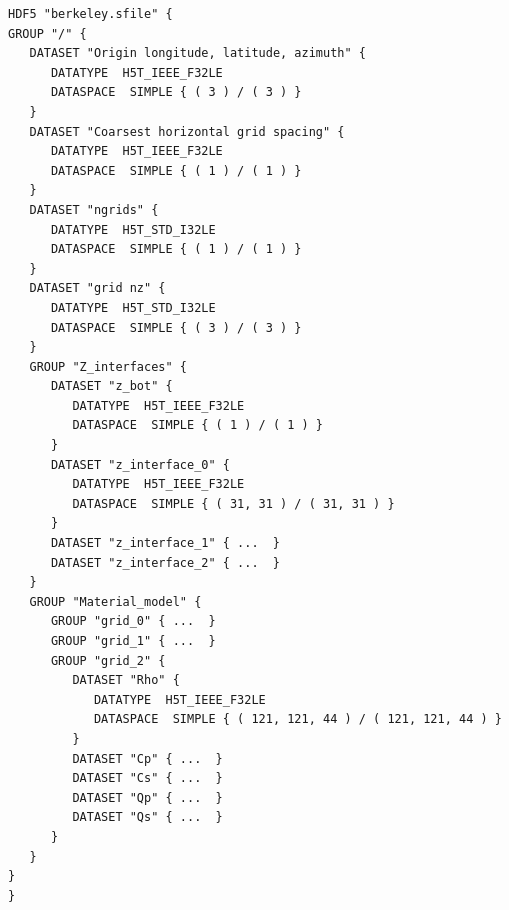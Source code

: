 \documentclass[11pt]{report}
\begin{document}
\begin{verbatim}
HDF5 "berkeley.sfile" {
GROUP "/" {
   DATASET "Origin longitude, latitude, azimuth" {
      DATATYPE  H5T_IEEE_F32LE
      DATASPACE  SIMPLE { ( 3 ) / ( 3 ) }
   }
   DATASET "Coarsest horizontal grid spacing" {
      DATATYPE  H5T_IEEE_F32LE
      DATASPACE  SIMPLE { ( 1 ) / ( 1 ) }
   }
   DATASET "ngrids" {
      DATATYPE  H5T_STD_I32LE
      DATASPACE  SIMPLE { ( 1 ) / ( 1 ) }
   }
   DATASET "grid nz" {
      DATATYPE  H5T_STD_I32LE
      DATASPACE  SIMPLE { ( 3 ) / ( 3 ) }
   }
   GROUP "Z_interfaces" {
      DATASET "z_bot" {
         DATATYPE  H5T_IEEE_F32LE
         DATASPACE  SIMPLE { ( 1 ) / ( 1 ) }
      }
      DATASET "z_interface_0" {
         DATATYPE  H5T_IEEE_F32LE
         DATASPACE  SIMPLE { ( 31, 31 ) / ( 31, 31 ) }
      }
      DATASET "z_interface_1" { ...  }
      DATASET "z_interface_2" { ...  }
   }
   GROUP "Material_model" {
      GROUP "grid_0" { ...  }
      GROUP "grid_1" { ...  }
      GROUP "grid_2" {
         DATASET "Rho" {
            DATATYPE  H5T_IEEE_F32LE
            DATASPACE  SIMPLE { ( 121, 121, 44 ) / ( 121, 121, 44 ) }
         }
         DATASET "Cp" { ...  }
         DATASET "Cs" { ...  }
         DATASET "Qp" { ...  }
         DATASET "Qs" { ...  }
      }
   }
}
}
\end{verbatim}



\end{document}
